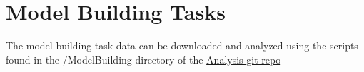 \documentclass[
  12pt,
]{book}
\begin{document}
\hypertarget{model-building-tasks}{%
\section{Model Building Tasks}\label{model-building-tasks}}

The model building task data can be downloaded and analyzed using the scripts found in the /ModelBuilding directory of the \href{https://github.com/smweis/Virtual_Silcton_Analysis}{Analysis git repo}

  
\end{document}
